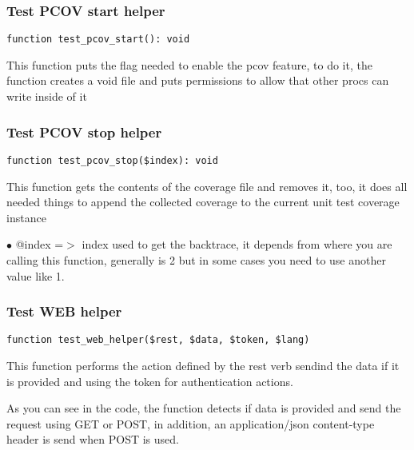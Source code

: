 \documentclass[a4paper]{article}
\begin{document}
\hypertarget{toc6}{}
\subsubsection{Test PCOV start helper}

\begin{lstlisting}
function test_pcov_start(): void
\end{lstlisting}

This function puts the flag needed to enable the pcov feature, to do it,
the function creates a void file and puts permissions to allow that other
procs can write inside of it

\hypertarget{toc7}{}
\subsubsection{Test PCOV stop helper}

\begin{lstlisting}
function test_pcov_stop($index): void
\end{lstlisting}

This function gets the contents of the coverage file and removes it, too,
it does all needed things to append the collected coverage to the current
unit test coverage instance

\begin{compactitem}
\item[\color{myblue}$\bullet$] @index =$>$ index used to get the backtrace, it depends from where you are
          calling this function, generally is 2 but in some cases you need
          to use another value like 1.
\end{compactitem}

\hypertarget{toc8}{}
\subsubsection{Test WEB helper}

\begin{lstlisting}
function test_web_helper($rest, $data, $token, $lang)
\end{lstlisting}

This function performs the action defined by the rest verb sendind the data if it is
provided and using the token for authentication actions.

As you can see in the code, the function detects if data is provided and send the request
using GET or POST, in addition, an application/json content-type header is send when POST
is used.
\end{document}
